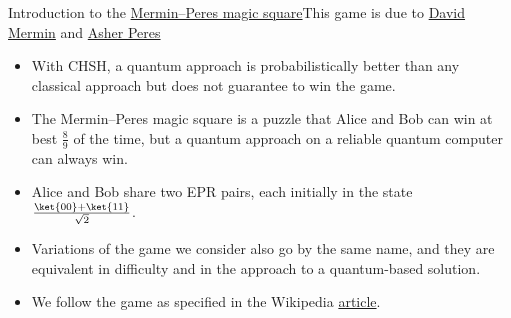 \begin{frame}{Introduction to the \href{https://en.wikipedia.org/wiki/Quantum_pseudo-telepathy\#The_Mermin\%E2\%80\%93Peres_magic_square_game}{Mermin--Peres magic square}}{This game is due to \href{https://en.wikipedia.org/wiki/N._David_Mermin}{David Mermin} and \href{https://en.wikipedia.org/wiki/Asher_Peres}{Asher Peres}}

\begin{itemize}[<+->]
    \item With CHSH, a quantum approach is probabilistically better than any classical approach but does not guarantee to win the game.
    \item The Mermin--Peres magic square is a puzzle that Alice and Bob can win at best $\frac{8}{9}$ of the time, but a quantum approach on a reliable quantum computer can always win.
    \item Alice and Bob share two EPR pairs, each initially in the state $\frac{\ket{00}+\ket{11}}{\sqrt{2}}$.
    \item Variations of the game we consider also go by the same name, and they are equivalent in difficulty and in the approach to a quantum-based solution.
    \item We follow the game as specified in the Wikipedia \href{https://en.wikipedia.org/wiki/Quantum_pseudo-telepathy\#The_Mermin\%E2\%80\%93Peres_magic_square_game}{article}.
\end{itemize}
    
\end{frame}

